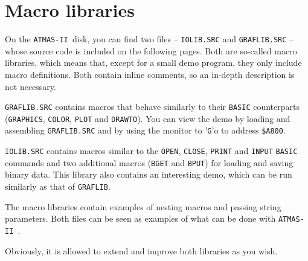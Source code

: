 \documentclass[10pt,a4paper,twoside,final,openright,titlepage]{memoir}
\def\atmas{\texttt{AT\-MAS-II }}
\begin{document}
\section{Macro libraries}

On the \atmas disk, you can find two files -- \texttt{IOLIB.SRC} and \texttt{GRAFLIB.SRC} --
whose source code is included on the following pages.
Both are so-called macro libraries, which means that, except for a small
demo program, they only include macro definitions. Both contain inline comments,
so an in-depth description is not necessary.

\texttt{GRAFLIB.SRC} contains macros that behave similarly to their \texttt{BASIC} counterparts
(\texttt{GRAPHICS}, \texttt{COLOR}, \texttt{PLOT} and \texttt{DRAWTO}).
You can view the demo by loading and assembling \texttt{GRAFLIB.SRC} and by using the
monitor to '\texttt{G}'o to address \texttt{\$A800}.

\texttt{IOLIB.SRC} contains macros similar to the \texttt{OPEN}, \texttt{CLOSE}, \texttt{PRINT} and \texttt{INPUT}
\texttt{BASIC} commands and two additional macros (\texttt{BGET} and \texttt{BPUT}) for loading
and saving binary data. This library also contains an interesting demo, which can be run similarly
as that of \texttt{GRAFLIB}.

The macro libraries contain examples of nesting macros and passing string parameters.
Both files can be seen as examples of what can be done with \atmas.

Obviously, it is allowed to extend and improve both libraries as you wish.
\end{document}
